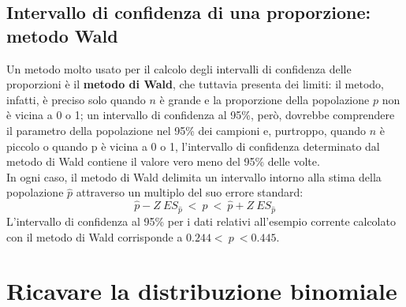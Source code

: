 \documentclass[10pt, draft]{book}
\newcounter{example}[section]
\begin{document}
\begin{example}
    \subsection{Intervallo di confidenza di una proporzione: metodo Wald}
    Un metodo molto usato per il calcolo degli intervalli di confidenza delle proporzioni è il \textbf{metodo di Wald}, che tuttavia presenta dei limiti: il metodo, infatti, è preciso solo quando $n$ è grande e la proporzione della popolazione $p$ non è vicina a 0 o 1; un intervallo di confidenza al 95\%, però, dovrebbe comprendere il parametro della popolazione nel 95\% dei campioni e, purtroppo, quando $n$ è piccolo o quando p è vicina a 0 o 1, l'intervallo di confidenza determinato dal metodo di Wald contiene il valore vero meno del 95\% delle volte.
    \\
    In ogni caso, il metodo di Wald delimita un intervallo intorno alla stima della popolazione $\hat{p}$ attraverso un multiplo del suo errore standard:
    \begin{equation}
    \hat{p} - Z \ ES_{\hat{p}} \ < \ p \ < \ \hat{p} + Z \ ES_{\hat{p}}
    \end{equation}
    L'intervallo di confidenza al 95\% per i dati relativi all'esempio corrente calcolato con il metodo di Wald corrisponde a $0.244 < \ p \ < 0.445$.
\end{example}

\section{Ricavare la distribuzione binomiale}
\end{document}
